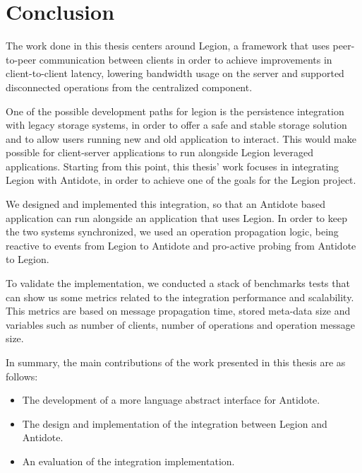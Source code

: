 \chapter{Conclusion}
\label{cha:conclusion}
The work done in this thesis centers around Legion, a framework that uses peer-to-peer communication between clients in order to achieve improvements in client-to-client latency, lowering bandwidth usage on the server and supported disconnected operations from the centralized component.\par
	One of the possible development paths for legion is the persistence integration with legacy storage systems, in order to offer a safe and stable storage solution and to allow users running new and old application to interact. This would make possible for client-server applications to run alongside Legion leveraged applications. Starting from this point, this thesis' work focuses in integrating Legion with Antidote, in order to achieve one of the goals for the Legion project.\par
	We designed and implemented this integration, so that an Antidote based application can run alongside an application that uses Legion. In order to keep the two systems synchronized, we used an operation propagation logic, being reactive to events from Legion to Antidote and pro-active probing from Antidote to Legion.\par
	To validate the implementation, we conducted a stack of benchmarks tests that can show us some metrics related to the integration performance and scalability. This metrics are based on message propagation time, stored meta-data size and variables such as number of clients, number of operations and operation message size.\par
In summary, the main contributions of the work presented in this thesis are as follows:

\begin{itemize}
\item The development of a more language abstract interface for Antidote.
\item The design and implementation of the integration between Legion and Antidote.
\item An evaluation of the integration implementation.
\end{itemize}

